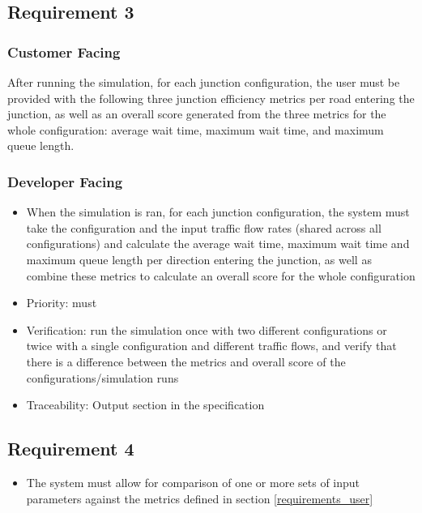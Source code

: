 \documentclass{article}
\begin{document}
\subsection{Requirement 3}
\subsubsection{Customer Facing}
After running the simulation, for each junction configuration, 
the user must be provided with the following three junction efficiency metrics 
per road entering the junction, as well as an overall score generated from the 
three metrics for the whole configuration: average wait time, maximum wait time, 
and maximum queue length.
\subsubsection{Developer Facing}
\begin{itemize}
  \item When the simulation is ran, for each junction configuration, the system 
  must take the configuration and the input traffic flow rates (shared across all 
  configurations) and calculate the average wait time, maximum wait time and 
  maximum queue length per direction entering the junction, as well as combine 
  these metrics to calculate an overall score for the whole configuration
  \item Priority: must
  \item Verification: run the simulation once with two different configurations 
  or twice with a single configuration and different traffic flows, and verify 
  that there is a difference between the metrics and overall score of the 
  configurations/simulation runs
  \item Traceability: Output section in the specification
\end{itemize}

\subsection{Requirement 4}
\begin{itemize}
  \item The system must allow for comparison of one or more sets of input parameters against the metrics defined in section \ref{requirements_user}
\end{itemize}
\end{document}
